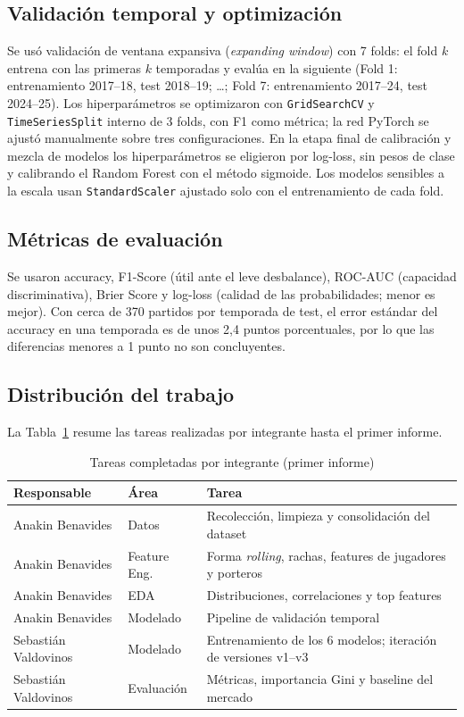 \documentclass{ieeeaccess}
\begin{document}
\subsection{Validación temporal y optimización}
Se usó validación de ventana expansiva (\textit{expanding window}) con 7 folds: el fold $k$ entrena con las primeras $k$ temporadas y evalúa en la siguiente (Fold 1: entrenamiento 2017--18, test 2018--19; \dots; Fold 7: entrenamiento 2017--24, test 2024--25). Los hiperparámetros se optimizaron con \texttt{GridSearchCV} y \texttt{TimeSeriesSplit} interno de 3 folds, con F1 como métrica; la red PyTorch se ajustó manualmente sobre tres configuraciones. En la etapa final de calibración y mezcla de modelos los hiperparámetros se eligieron por log-loss, sin pesos de clase y calibrando el Random Forest con el método sigmoide. Los modelos sensibles a la escala usan \texttt{StandardScaler} ajustado solo con el entrenamiento de cada fold.

\subsection{Métricas de evaluación}
Se usaron accuracy, F1-Score (útil ante el leve desbalance), ROC-AUC (capacidad discriminativa), Brier Score y log-loss (calidad de las probabilidades; menor es mejor). Con cerca de 370 partidos por temporada de test, el error estándar del accuracy en una temporada es de unos 2,4 puntos porcentuales, por lo que las diferencias menores a 1 punto no son concluyentes.

\subsection{Distribución del trabajo}
La Tabla~\ref{tab:tareas} resume las tareas realizadas por integrante hasta el primer informe.

\begin{table}[!t]
\caption{Tareas completadas por integrante (primer informe)}
\label{tab:tareas}
\centering
\footnotesize
\setlength{\tabcolsep}{3pt}
\begin{tabular}{@{}p{1.9cm}p{1.7cm}p{4.2cm}@{}}
\toprule
\textbf{Responsable} & \textbf{Área} & \textbf{Tarea} \\
\midrule
Anakin Benavides & Datos & Recolección, limpieza y consolidación del dataset \\
Anakin Benavides & Feature Eng. & Forma \textit{rolling}, rachas, features de jugadores y porteros \\
Anakin Benavides & EDA & Distribuciones, correlaciones y top features \\
Anakin Benavides & Modelado & Pipeline de validación temporal \\
Sebastián Valdovinos & Modelado & Entrenamiento de los 6 modelos; iteración de versiones v1--v3 \\
Sebastián Valdovinos & Evaluación & Métricas, importancia Gini y baseline del mercado \\
\bottomrule
\end{tabular}
\end{table}
\end{document}
